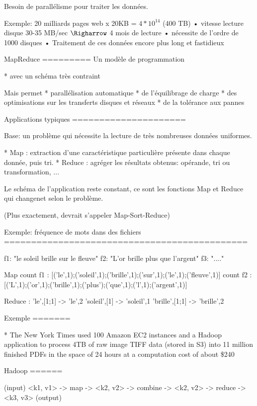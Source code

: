 

Besoin de parallélisme pour traiter les données.


Exemple: 20 milliards pages web x 20KB = $4* 10^{14}$ (400 TB)
• vitesse lecture disque 30-35 MB/sec
$\Righarrow$ 4 mois de lecture
• nécessite de l'ordre de 1000 disques
• Traitement de ces données encore plus long et fastidieux


MapReduce
=========
Un modèle de programmation

* avec un schéma très contraint

Mais permet
* parallélisation automatique
* de l'équilibrage de charge
* des optimisations sur les transferts disques et réseaux
* de la tolérance aux pannes


Applications typiques
=====================


Base: un problème qui nécessite la lecture de très 
nombreuses données uniformes.

* Map : extraction d'une caractéristique particulière présente dans chaque donnée,
puis tri.
* Reduce : agréger les résultats obtenus: opérande, tri ou transformation, ...

Le schéma de l'application reste constant, ce sont les 
fonctions Map et Reduce qui changenet selon le problème.

(Plus exactement, devrait s'appeler Map-Sort-Reduce)


Exemple: fréquence de mots dans des fichiers
=============================================

f1: "le soleil brille sur le fleuve"
f2: "L'or brille plus que l'argent"
f3: "...."

Map count f1 : [('le',1);('soleil',1);('brille',1);('sur',1);('le',1);('fleuve',1)]
    count f2 : [('L',1);('or',1);('brille',1);('plus');('que',1);('l',1);('argent',1)]

Reduce :
     'le',[1;1]     ->  'le',2
     'soleil',[1]   ->  'soleil',1
     'brille',[1;1]   ->  'brille',2


Exemple
=======

* The New York Times used 100 Amazon EC2 instances and a Hadoop application to process 4TB of raw image TIFF data (stored in S3) into 11 million finished PDFs in the space of 24 hours at a computation cost of about  
\$240 



Hadoop
======

(input) <k1, v1> -> map -> <k2, v2> -> combine -> <k2, v2> -> reduce -> <k3, v3> (output) 



